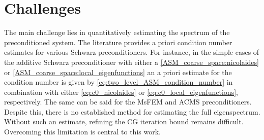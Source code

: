 \section{Challenges}\label{sec:challenges}
The main challenge lies in quantitatively estimating the spectrum of the preconditioned system. The literature provides a priori condition number estimates for various Schwarz preconditioners. For instance, in the simple cases of the additive Schwarz preconditioner with either a \ref{ASM_coarse_space:nicolaides} or \ref{ASM_coarse_space:local_eigenfunctions} an a priori estimate for the condition number is given by \cref{eq:two_level_ASM_condition_number} in combination with either \cref{eq:c0_nicolaides} or \cref{eq:c0_local_eigenfunctions}, respectively. The same can be said for the MsFEM and ACMS preconditioners. Despite this, there is no established method for estimating the full eigenspectrum. Without such an estimate, refining the CG iteration bound remains difficult. Overcoming this limitation is central to this work.